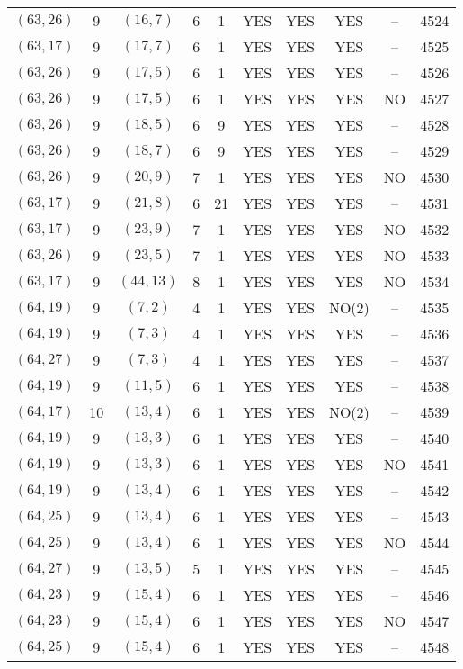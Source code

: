 \begin{longtable}{|c|c|c|c|c|c|c|c|c|c|}
$(63, 26)$ & 9 & $(16, 7)$ & 6 & 1 & YES & YES & YES & -- & 4524\\
$(63, 17)$ & 9 & $(17, 7)$ & 6 & 1 & YES & YES & YES & -- & 4525\\
$(63, 26)$ & 9 & $(17, 5)$ & 6 & 1 & YES & YES & YES & -- & 4526\\
$(63, 26)$ & 9 & $(17, 5)$ & 6 & 1 & YES & YES & YES & NO & 4527\\
$(63, 26)$ & 9 & $(18, 5)$ & 6 & 9 & YES & YES & YES & -- & 4528\\
$(63, 26)$ & 9 & $(18, 7)$ & 6 & 9 & YES & YES & YES & -- & 4529\\
$(63, 26)$ & 9 & $(20, 9)$ & 7 & 1 & YES & YES & YES & NO & 4530\\
$(63, 17)$ & 9 & $(21, 8)$ & 6 & 21 & YES & YES & YES & -- & 4531\\
$(63, 17)$ & 9 & $(23, 9)$ & 7 & 1 & YES & YES & YES & NO & 4532\\
$(63, 26)$ & 9 & $(23, 5)$ & 7 & 1 & YES & YES & YES & NO & 4533\\
$(63, 17)$ & 9 & $(44, 13)$ & 8 & 1 & YES & YES & YES & NO & 4534\\
$(64, 19)$ & 9 & $(7, 2)$ & 4 & 1 & YES & YES & NO(2) & -- & 4535\\
$(64, 19)$ & 9 & $(7, 3)$ & 4 & 1 & YES & YES & YES & -- & 4536\\
$(64, 27)$ & 9 & $(7, 3)$ & 4 & 1 & YES & YES & YES & -- & 4537\\
$(64, 19)$ & 9 & $(11, 5)$ & 6 & 1 & YES & YES & YES & -- & 4538\\
$(64, 17)$ & 10 & $(13, 4)$ & 6 & 1 & YES & YES & NO(2) & -- & 4539\\
$(64, 19)$ & 9 & $(13, 3)$ & 6 & 1 & YES & YES & YES & -- & 4540\\
$(64, 19)$ & 9 & $(13, 3)$ & 6 & 1 & YES & YES & YES & NO & 4541\\
$(64, 19)$ & 9 & $(13, 4)$ & 6 & 1 & YES & YES & YES & -- & 4542\\
$(64, 25)$ & 9 & $(13, 4)$ & 6 & 1 & YES & YES & YES & -- & 4543\\
$(64, 25)$ & 9 & $(13, 4)$ & 6 & 1 & YES & YES & YES & NO & 4544\\
$(64, 27)$ & 9 & $(13, 5)$ & 5 & 1 & YES & YES & YES & -- & 4545\\
$(64, 23)$ & 9 & $(15, 4)$ & 6 & 1 & YES & YES & YES & -- & 4546\\
$(64, 23)$ & 9 & $(15, 4)$ & 6 & 1 & YES & YES & YES & NO & 4547\\
$(64, 25)$ & 9 & $(15, 4)$ & 6 & 1 & YES & YES & YES & -- & 4548\\

\end{longtable}
